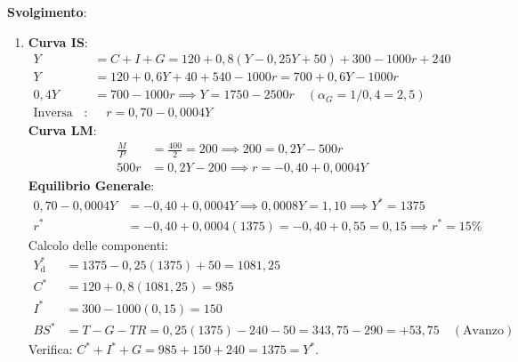\begin{esercizio}
\textbf{Svolgimento}:
\begin{enumerate}
    \item \textbf{Curva IS}:
    \begin{align*}
        Y &= C + I + G = 120 + 0{,}8(Y - 0{,}25 Y + 50) + 300 - 1000 r + 240 \\
        Y &= 120 + 0{,}6 Y + 40 + 540 - 1000 r = 700 + 0{,}6 Y - 1000 r \\
        0{,}4 Y &= 700 - 1000 r \implies Y = 1750 - 2500 r \quad (\alpha_G = 1/0{,}4 = 2{,}5) \\
        \text{Inversa IS}: &\quad r = 0{,}70 - 0{,}0004 Y
    \end{align*}
    \textbf{Curva LM}:
    \begin{align*}
        \frac{M}{P} &= \frac{400}{2} = 200 \implies 200 = 0{,}2 Y - 500 r \\
        500 r &= 0{,}2 Y - 200 \implies r = -0{,}40 + 0{,}0004 Y
    \end{align*}
    \textbf{Equilibrio Generale}:
    \begin{align*}
        0{,}70 - 0{,}0004 Y &= -0{,}40 + 0{,}0004 Y \implies 0{,}0008 Y = 1{,}10 \implies Y^* = 1375 \\[0.4em]
        r^* &= -0{,}40 + 0{,}0004(1375) = -0{,}40 + 0{,}55 = 0{,}15 \implies r^* = 15\%
    \end{align*}
    Calcolo delle componenti:
    \begin{align*}
        Y_{\mathrm{d}}^* &= 1375 - 0{,}25(1375) + 50 = 1081{,}25 \\
        C^* &= 120 + 0{,}8(1081{,}25) = 985 \\
        I^* &= 300 - 1000(0{,}15) = 150 \\
        BS^* &= T - G - TR = 0{,}25(1375) - 240 - 50 = 343{,}75 - 290 = +53{,}75 \quad (\text{Avanzo})
    \end{align*}
    Verifica: $C^* + I^* + G = 985 + 150 + 240 = 1375 = Y^*$.


\end{enumerate}
\end{esercizio}
